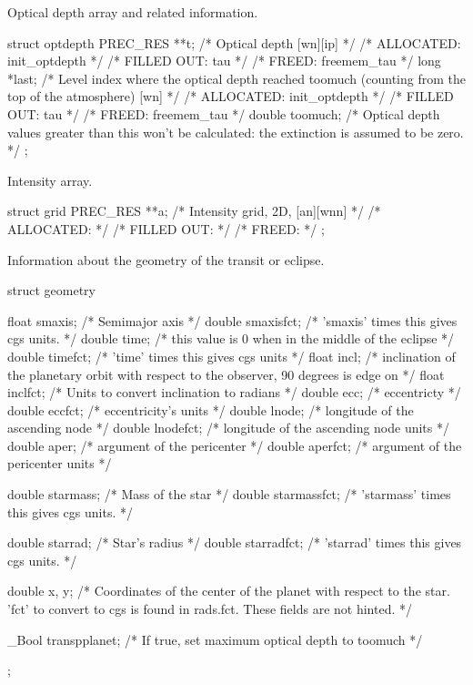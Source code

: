 \documentclass[letterpaper,12pt]{article}
\begin{document}
\noindent \newline
Optical depth array and related information.
\begin{plain}
struct optdepth{
  PREC_RES **t;     /* Optical depth [wn][ip]                               */
    /* ALLOCATED:       init_optdepth					    */
    /* FILLED OUT:      tau						    */
    /* FREED:           freemem_tau					    */
  long *last;       /*  Level index where the optical depth reached toomuch
                       (counting from the top of the atmosphere) [wn]       */
    /* ALLOCATED: init_optdepth	                                            */
    /* FILLED OUT: tau							    */
    /* FREED: freemem_tau						    */
  double toomuch;   /* Optical depth values greater than this won't be
                       calculated: the extinction is assumed to be zero.    */
};
\end{plain}

\noindent
Intensity array.
\begin{plain}
struct grid{
  PREC_RES **a;      /* Intensity grid, 2D, [an][wnn]                       */
    /* ALLOCATED:							    */
    /* FILLED OUT:							    */
    /* FREED: 								    */ 
};
\end{plain}

\noindent
Information about the geometry of the transit or eclipse.
\begin{plain}
struct geometry{
  float smaxis;       /* Semimajor axis                                     */
  double smaxisfct;   /* 'smaxis' times this gives cgs units.               */
  double time;        /* this value is 0 when in the middle of the eclipse  */
  double timefct;     /* 'time' times this gives cgs units                  */
  float incl;         /* inclination of the planetary orbit with respect
                         to the observer, 90 degrees is edge on             */
  float inclfct;      /* Units to convert inclination to radians            */
  double ecc;         /* eccentricty                                        */
  double eccfct;      /* eccentricity's units                               */
  double lnode;       /* longitude of the ascending node                    */
  double lnodefct;    /* longitude of the ascending node units              */
  double aper;        /* argument of the pericenter                         */
  double aperfct;     /* argument of the pericenter units                   */

  double starmass;    /* Mass of the star                                   */
  double starmassfct; /* 'starmass' times this gives cgs units.             */

  double starrad;     /* Star's radius                                      */
  double starradfct;  /* 'starrad' times this gives cgs units.              */

  double x, y;        /*  Coordinates of the center of the planet with
                         respect to the star. 'fct' to convert to cgs is
                         found in rads.fct. These fields are not hinted.    */

  _Bool transpplanet; /* If true, set maximum optical depth to toomuch      */
};
\end{plain}
\end{document}
